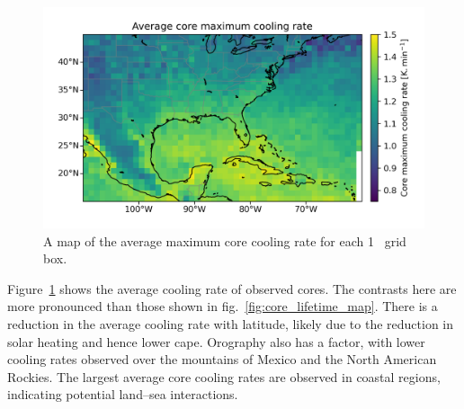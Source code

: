 \begin{figure}[tp]
    \centering
    \includegraphics[width=\textwidth]{figures/chapter2_07.png}
    \caption[
    A map of the average maximum core cooling rate for each 1
    \textdegree\ grid box
    ]{
    A map of the  average maximum core cooling rate for each 1
    \textdegree\ grid box.
    }
    \label{fig:core_cooling_rate_map}
\end{figure}

Figure~\ref{fig:core_cooling_rate_map} shows the average cooling rate of observed cores.
The contrasts here are more pronounced than those shown in fig.~\ref{fig:core_lifetime_map}.
There is a reduction in the average cooling rate with latitude, likely due to the reduction in solar heating and hence lower \acrshort{cape}.
Orography also has a factor, with lower cooling rates observed over the mountains of Mexico and the North American Rockies.
The largest average core cooling rates are observed in coastal regions, indicating potential land--sea interactions.

